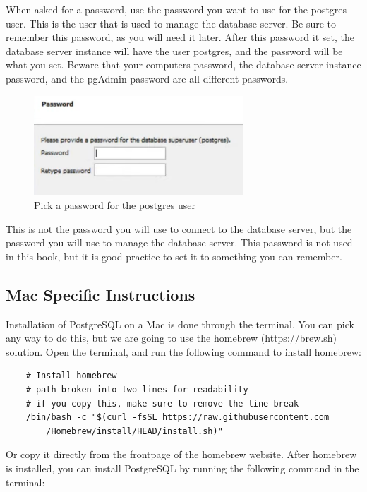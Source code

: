 When asked for a password, use the password you want to use for the postgres user. This is the user that is used to manage the database server. Be sure to remember this password, as you will need it later. After this password it set, the database server instance will have the user postgres, and the password will be what you set. Beware that your computers password, the database server instance password, and the pgAdmin password are all different passwords.

\begin{figure}[htb]
    \centering
    \includegraphics[width=0.7\textwidth]{content/1-relational-databases/figures/1.install-for-windows-3.png}
    \caption{Pick a password for the postgres user}
    \label{fig:1.postgresql-download-3.png}
\end{figure}


This is not the password you will use to connect to the database server, but the password you will use to manage the database server. This password is not used in this book, but it is good practice to set it to something you can remember.

\subsection{Mac Specific Instructions}
Installation of PostgreSQL on a Mac is done through the terminal. You can pick any way to do this, but we are going to use the homebrew (https://brew.sh) solution. Open the terminal, and run the following command to install homebrew: 

\begin{verbatim}
    # Install homebrew
    # path broken into two lines for readability
    # if you copy this, make sure to remove the line break
    /bin/bash -c "$(curl -fsSL https://raw.githubusercontent.com
        /Homebrew/install/HEAD/install.sh)"
\end{verbatim}

Or copy it directly from the frontpage of the homebrew website. After homebrew is installed, you can install PostgreSQL by running the following command in the terminal:

